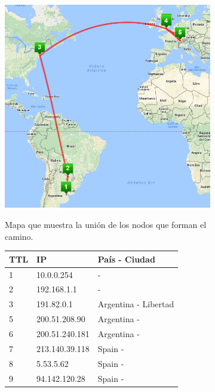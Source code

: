 \begin{figure}[ht]
  \hspace*{-0.4cm}
  \begin{subfigure}[b]{.60\textwidth}
    \includegraphics[width=\textwidth]{Imagenes/capetown_map.png}
    \label{fig:capetown_map}
    \caption{Mapa que muestra la unión de los nodos que forman el camino.}
  \end{subfigure}
  \begin{subfigure}[b]{.39\textwidth}
    \footnotesize
    \begin{tabular}{ l l l }
      \hline
      \textbf{TTL} & \textbf{IP} &  \textbf{País - Ciudad} \\ \hline
      1 & 10.0.0.254 &  - \\ \hline
      2 & 192.168.1.1 &  - \\ \hline
      \rowcolor[RGB]{196,214,255}
      3 & 191.82.0.1 & Argentina - Libertad\\ \hline
      5 & 200.51.208.90 & Argentina - \\ \hline
      6 & 200.51.240.181 & Argentina - \\ \hline
      7 & 213.140.39.118 & Spain - \\ \hline
      \rowcolor[RGB]{196,214,255}
      8 & 5.53.5.62 & Spain - \\ \hline
      9 & 94.142.120.28 & Spain - \\ \hline

\end{tabular}
\end{subfigure}
\end{figure}
